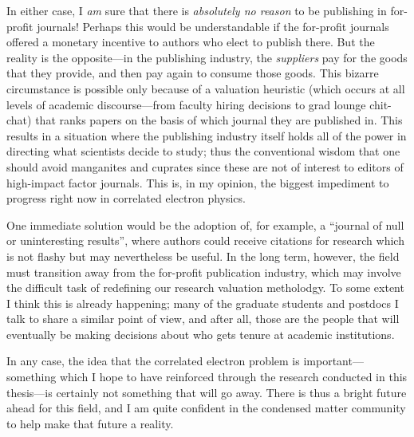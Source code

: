 In either case, I \emph{am} sure that there is \emph{absolutely no reason} to be publishing in for-profit journals!
Perhaps this would be understandable if the for-profit journals offered a monetary incentive to authors who elect to publish there.
But the reality is the opposite---in the publishing industry, the \emph{suppliers} pay for the goods that they provide, and then pay again to consume those goods.
This bizarre circumstance is possible only because of a valuation heuristic (which occurs at all levels of academic discourse---from faculty hiring decisions to grad lounge chit-chat) that ranks papers on the basis of which journal they are published in.
This results in a situation where the publishing industry itself holds all of the power in directing what scientists decide to study; thus the conventional wisdom that one should avoid manganites and cuprates since these are not of interest to editors of high-impact factor journals.
This is, in my opinion, the biggest impediment to progress right now in correlated electron physics.

One immediate solution would be the adoption of, for example, a ``journal of null or uninteresting results'', where authors could receive citations for research which is not flashy but may nevertheless be useful.
In the long term, however, the field must transition away from the for-profit publication industry, which may involve the difficult task of redefining our research valuation metholodgy.
To some extent I think this is already happening; many of the graduate students and postdocs I talk to share a similar point of view, and after all, those are the people that will eventually be making decisions about who gets tenure at academic institutions.

In any case, the idea that the correlated electron problem is important---something which I hope to have reinforced through the research conducted in this thesis---is certainly not something that will go away.
There is thus a bright future ahead for this field, and I am quite confident in the condensed matter community to help make that future a reality.
